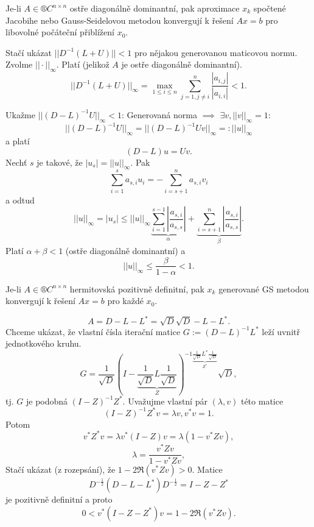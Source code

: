 \documentclass[12pt]{article}					%
\begin{document}
\begin{veta}
	Je-li $A \in ®C^{n \times n}$ ostře diagonálně dominantní, pak aproximace $x_k$ spočtené Jacobihe nebo Gauss-Seidelovou metodou konvergují k řešení $Ax = b$ pro libovolné počáteční přiblížení $x_0$.

	\begin{dukazin}
		Stačí ukázat $||D^{-1}(L + U)|| < 1$ pro nějakou generovanou maticovou normu. Zvolme $||·||_∞$. Platí (jelikož $A$ je ostře diagonálně dominantní).
		$$ ||D^{-1}(L + U)||_∞ = \max_{1 ≤ i ≤ n} \sum_{j=1, j≠i}^n \frac{|a_{i, j}|}{|a_{i, i}|} < 1. $$

		Ukažme $||(D - L)^{-1}U ||_∞ < 1$: Generovaná norma $\implies$ $\exists v, ||v||_∞ = 1:$
		$$ ||(D - L)^{-1} U||_∞ = ||(D - L)^{-1}Uv||_∞ =: ||u||_∞ $$
		a platí
		$$ (D - L)u = Uv. $$
		Nechť $s$ je takové, že $|u_s| = ||u||_∞$. Pak
		$$ \sum_{i=1}^s a_{s, i}u_i = - \sum_{i=s+1}^n a_{s, i} v_i $$
		a odtud
		$$ ||u||_∞ = |u_s| ≤ ||u||_∞ \underbrace{\sum_{i=1}^{s - 1} |\frac{a_{s, i}}{a_{s, s}}|}_\alpha + \underbrace{\sum_{i=s+1}^n |\frac{a_{s, i}}{a_{s, s}}|}_\beta. $$
		Platí $\alpha + \beta < 1$ (ostře diagonálně dominantní) a 
		$$ ||u||_∞ ≤ \frac{\beta}{1 - \alpha} < 1. $$
	\end{dukazin}
\end{veta}

\begin{veta}
	Je-li $A \in ®C^{n \times n}$ hermitovská pozitivně definitní, pak $x_k$ generované GS metodou konvergují k řešení $Ax = b$ pro každé $x_0$.

	\begin{dukazin}
		$$ A = D - L - L^* = \sqrt{D}\sqrt{D} - L - L^*. $$
		Chceme ukázat, že vlastní čísla iterační matice $G := (D - L)^{-1} L^*$ leží uvnitř jednotkového kruhu.
		$$ G = \frac{1}{\sqrt{D}} (I - \underbrace{\frac{1}{\sqrt{D}}L\frac{1}{\sqrt{D}}}_Z)^{-1 \underbrace{\frac{1}{\sqrt{D}}L^*\frac{1}{\sqrt{D}}}_{Z^*}} \sqrt{D}, $$
		tj. $G$ je podobná $(I - Z)^{-1}Z^*$. Uvažujme vlastní pár $(\lambda, v)$ této matice
		$$ (I - Z)^{-1}Z^*v = \lambda v, v^* v = 1. $$
		Potom
		$$ v^*Z^*v = \lambda v^* (I - Z)v = \lambda(1 - v^* Z v), $$
		$$ \lambda = \frac{v^* Z v}{1 - v^* Z v}, $$
		Stačí ukázat (z rozepsání), že $1 - 2\Re(v^* Z v) > 0$. Matice
		$$ D^{-\frac{1}{2}}(D - L - L^*)D^{-\frac{1}{2}} = I - Z - Z^* $$
		je pozitivně definitní a proto
		$$ 0 < v^*(I - Z - Z^*)v = 1 - 2\Re(v^* Z v). $$
	\end{dukazin}
\end{veta}
\end{document}
